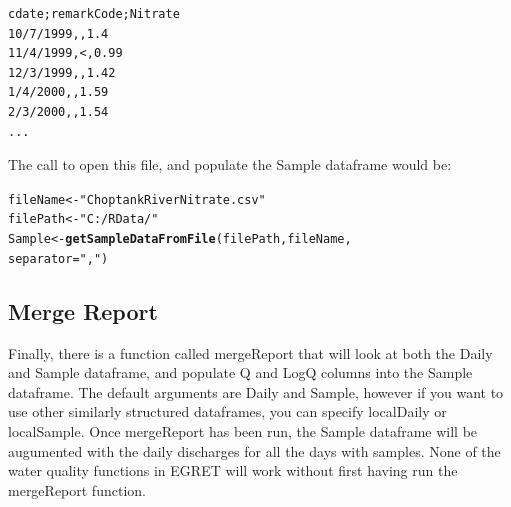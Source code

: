 \documentclass[a4paper,11pt]{article}\usepackage[]{graphicx}\usepackage[]{color}
\makeatletter
\newcommand{\hlstr}[1]{\textcolor[rgb]{0.192,0.494,0.8}{#1}}%
\newcommand{\hlstd}[1]{\textcolor[rgb]{0.345,0.345,0.345}{#1}}%
\newcommand{\hlkwb}[1]{\textcolor[rgb]{0.69,0.353,0.396}{#1}}%
\newcommand{\hlkwc}[1]{\textcolor[rgb]{0.333,0.667,0.333}{#1}}%
\newcommand{\hlkwd}[1]{\textcolor[rgb]{0.737,0.353,0.396}{\textbf{#1}}}%
\newenvironment{kframe}{%
 \def\at@end@of@kframe{}%
 \ifinner\ifhmode%
  \def\at@end@of@kframe{\end{minipage}}%
  \begin{minipage}{\columnwidth}%
 \fi\fi%
 \def\FrameCommand##1{\hskip\@totalleftmargin \hskip-\fboxsep
 \colorbox{shadecolor}{##1}\hskip-\fboxsep
     \hskip-\linewidth \hskip-\@totalleftmargin \hskip\columnwidth}%
 \MakeFramed {\advance\hsize-\width
   \@totalleftmargin\z@ \linewidth\hsize
   \@setminipage}}%
 {\par\unskip\endMakeFramed%
 \at@end@of@kframe}
\newenvironment{knitrout}{}{} %
\makeatother
\begin{document}
\begin{verbatim}
cdate;remarkCode;Nitrate
10/7/1999,,1.4
11/4/1999,<,0.99
12/3/1999,,1.42
1/4/2000,,1.59
2/3/2000,,1.54
...
\end{verbatim}
The call to open this file, and populate the Sample dataframe would be:
\begin{knitrout}
\color{fgcolor}\begin{kframe}
\begin{alltt}
\hlstd{fileName} \hlkwb{<-} \hlstr{"ChoptankRiverNitrate.csv"}
\hlstd{filePath} \hlkwb{<-}  \hlstr{"C:/RData/"}
\hlstd{Sample} \hlkwb{<-} \hlkwd{getSampleDataFromFile}\hlstd{(filePath,fileName,}
                                \hlkwc{separator}\hlstd{=}\hlstr{","}\hlstd{)}
\end{alltt}
\end{kframe}
\end{knitrout}


\FloatBarrier

\subsection{Merge Report}
Finally, there is a function called mergeReport that will look at both the Daily and Sample dataframe, and populate Q and LogQ columns into the Sample dataframe. The default arguments are Daily and Sample, however if you want to use other similarly structured dataframes, you can specify localDaily or localSample. Once mergeReport has been run, the Sample dataframe will be augumented with the daily discharges for all the days with samples.  None of the water quality functions in EGRET will work without first having run the mergeReport function.
\end{document}
